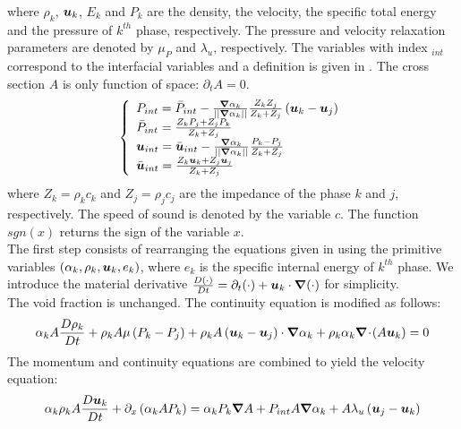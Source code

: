where $\rho_k$, $\boldsymbol u_k$, $E_k$ and $P_k$ are the density, the velocity, the specific total energy and the pressure of $k^{th}$ phase, respectively. The pressure and velocity relaxation parameters are denoted by $\mu_P$ and $\lambda_u$, respectively. The variables with index $_{int}$ correspond to the interfacial variables and a definition is given in . The cross section $A$ is only function of space: $\partial_t A = 0$. 
\begin{equation}
\label{eq:sev_equ2-app}
\left\{
\begin{array}{lll}
P_{int} = \bar{P}_{int} - \frac{\boldsymbol{\nabla} \alpha_k}{|| \boldsymbol{\nabla} \alpha_k ||} \frac{Z_k Z_j}{Z_k + Z_j} \left( \boldsymbol u_k-\boldsymbol u_j \right) \\
\bar{P}_{int} = \frac{Z_k P_j + Z_j P_k}{Z_k + Z_j} \\
\boldsymbol u_{int} = \bar{\boldsymbol u}_{int} - \frac{\boldsymbol{\nabla} \alpha_k}{|| \boldsymbol{\nabla} \alpha_k ||} \frac{P_k - P_j}{Z_k + Z_j} \\
\bar{\boldsymbol u}_{int} = \frac{Z_k \boldsymbol u _k + Z_j \boldsymbol u_j}{Z_k + Z_j}
\end{array}
\right.
\end{equation}
where $Z_k = \rho_k c_k$ and $Z_j = \rho_j c_j$ are the impedance of the phase $k$ and $j$, respectively. The speed of sound is denoted by the variable $c$. The function $sgn(x)$ returns the sign of the variable $x$.\\
The first step consists of rearranging the equations given in  using the primitive variables $(\alpha_k, \rho_k, \boldsymbol u_k, e_k)$, where $e_k$ is the specific internal energy of $k^{th}$ phase. We introduce the material derivative $\frac{D (\cdot)}{Dt} = \partial_t (\cdot) + \boldsymbol u_k \cdot \boldsymbol{\nabla} (\cdot)$ for simplicity. \\
The void fraction is unchanged. The continuity equation is modified as follows:
\begin{equation}
\label{eq:cont1-app}
\alpha_k A \frac{D \rho_k}{Dt} + \rho_k A \mu \left( P_k-P_j \right) + \rho_k A \left( \boldsymbol u_k-\boldsymbol u_j \right) \cdot \boldsymbol{\nabla} \alpha_k + \rho_k \alpha_k \boldsymbol{\nabla}\! \cdot \! \left( A \boldsymbol u_k \right) = 0
\end{equation}
The momentum and continuity equations are combined to yield the velocity equation:
\begin{equation}
\label{eq:vel1-app}
\alpha_k \rho_k A \frac{D\boldsymbol u_k}{Dt} + \partial_x \left( \alpha_k A P_k \right) = \alpha_k P_k \boldsymbol{\nabla} A + P_{int} A \boldsymbol{\nabla} \alpha_k + A \lambda_u \left( \boldsymbol u_j-\boldsymbol u_k \right)
\end{equation}
